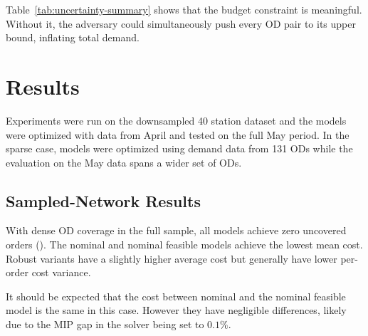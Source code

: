 \documentclass[11pt]{article}
\theoremstyle{definition}
\begin{document}
Table~\ref{tab:uncertainty-summary} shows that the budget constraint is meaningful. Without it,
the adversary could simultaneously push every OD pair to its upper bound,
inflating total demand.

\section{Results}

Experiments were run on the downsampled 40 station dataset and the models were optimized with data from April and tested on the full May period. In the sparse case, models were optimized using demand data from 131 ODs while the evaluation on the May data spans a wider set of ODs.

\subsection{Sampled-Network Results}

With dense OD coverage in the full sample, all models achieve zero uncovered orders
().
The nominal and nominal feasible models achieve the lowest mean cost. Robust variants have a slightly higher average cost but generally have lower per-order cost variance.

It should be expected that the cost between nominal and the nominal feasible model is the same in this case. However they have negligible differences, likely due to the MIP gap in the solver being set to $0.1\%$.
\end{document}
